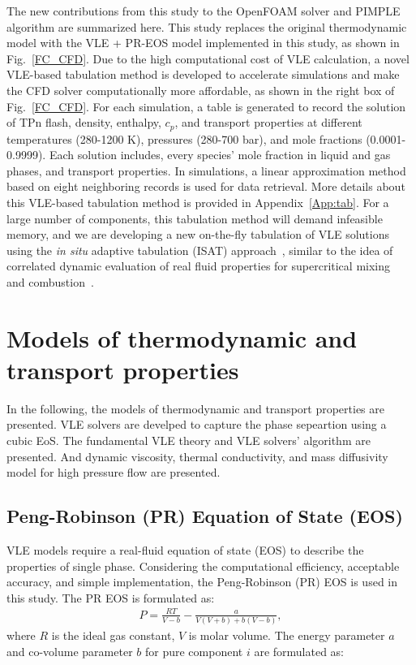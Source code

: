 The new contributions from this study to the OpenFOAM solver and PIMPLE algorithm are summarized here. This study replaces the original thermodynamic model with the VLE + PR-EOS model implemented in this study, as shown in Fig.~\ref{FC_CFD}. Due to the high computational cost of VLE calculation, a novel VLE-based tabulation method is developed to accelerate simulations and make the CFD solver computationally more affordable, as shown in the right box of Fig.~\ref{FC_CFD}. For each simulation, a table is generated to record the solution of TPn flash, density, enthalpy, $c_p$, and transport properties at different temperatures (280-1200 K), pressures (280-700 bar), and  mole fractions (0.0001-0.9999). Each solution includes, every species' mole fraction in liquid and gas phases, and transport properties. In simulations, a linear approximation method based on eight neighboring records is used for data retrieval. More details about this VLE-based tabulation method is provided in Appendix~\ref{App:tab}. For a large number of components, this tabulation method will demand infeasible memory, and we are developing a new on-the-fly tabulation of VLE solutions using the \textit{in situ} adaptive tabulation (ISAT) approach~\cite{zhang2021multi}, similar to the idea of correlated dynamic evaluation of real fluid properties for supercritical mixing~\cite{yang2017comparison} and combustion~\cite{milan2019time}.



\section{Models of thermodynamic and transport properties}
In the following, the models of thermodynamic and transport properties are presented. VLE solvers are develped to capture the phase sepeartion  using a cubic EoS. The fundamental VLE theory and VLE solvers' algorithm are presented. And dynamic viscosity, thermal conductivity, and mass diffusivity model for high pressure flow are presented.

\subsection{Peng-Robinson (PR) Equation of State (EOS)}
VLE models require a real-fluid equation of state (EOS) to describe the properties of single phase. Considering the computational efficiency, acceptable accuracy, and simple implementation, the Peng-Robinson (PR) EOS \cite{peng1976new} is used in this study. The PR EOS is formulated as:
\begin{align}
    P=\frac{RT}{V-b}-\frac{a}{V\left(V+b\right)+b\left(V-b\right)}, %
    \label{eq:preos}
\end{align}
where $R$ is the ideal gas constant, $V$ is molar volume. The energy parameter $a$ and co-volume parameter $b$ for pure component $i$ are formulated as:

